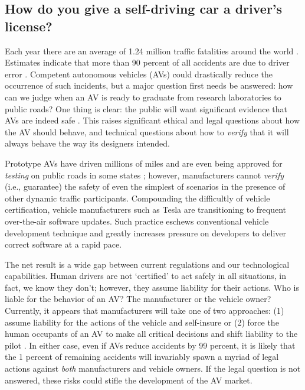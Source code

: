  \subsection{How do you give a self-driving car a driver's license?}
 Each year there are an average of 1.24 million traffic fatalities around the world \cite{Waldrop2015}. Estimates indicate that more than 90 percent of all accidents are due to driver error \cite{Waldrop2015}. Competent autonomous vehicles (AVs) could drastically reduce the occurrence of such incidents, but a major question first needs be answered:
 how can we judge when an AV is ready to graduate from research laboratories to public roads?
 One thing is clear: the public will want significant evidence that AVs are indeed safe \cite{weld1994first}. 
 This raises significant ethical and legal questions about how the AV should behave, and technical questions about how to \emph{verify} that it will always behave the way its designers intended.
 
 Prototype AVs have driven millions of miles and are even being approved for \emph{testing} on public roads in some states \cite{Iozzio2014}; however, manufacturers cannot \emph{verify} (i.e., guarantee) the safety of even the simplest of scenarios in the presence of other dynamic traffic participants. 
 Compounding the difficultly of vehicle certification, vehicle manufacturers such as Tesla are transitioning to frequent over-the-air software updates. Such practice eschews conventional vehicle development technique and greatly increases pressure on developers to deliver correct software at a rapid pace. 
 
 The net result is a wide gap between current regulations and our technological capabilities. 
 Human drivers are not `certified' to act safely in all situations, in fact, we know they don't; however, they assume liability for their actions.
 Who is liable for the behavior of an AV? The manufacturer or the vehicle owner?
 Currently, it appears that manufacturers will take one of two approaches: (1) assume liability for the actions of the vehicle and self-insure \cite{volvo15Liability} or (2) force the human occupants of an AV to make all critical decisions and shift liability to the pilot \cite{maurer2015autonomes}. In either case, even if AVs reduce accidents by 99 percent, it is likely that the 1 percent of remaining accidents will invariably spawn a myriad of legal actions against \emph{both} manufacturers \cite{russell2015research} and vehicle owners.   
 If the legal question is not answered, these risks could stifle the development of the AV market.
 
